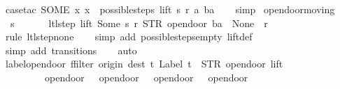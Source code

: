 \begin{isabellebody}
\ {\isacharparenleft}case{\isacharunderscore}tac\ {\isachardoublequoteopen}SOME\ x{\isachardot}\ x\ {\isacharbar}{\isasymin}{\isacharbar}\ possible{\isacharunderscore}steps\ lift\ s\ r\ a\ ba{\isachardoublequoteclose}{\isacharparenright}\isanewline
\ \ \isamarkupfalse%
\ simp%
\endisatagproof
{\isafoldproof}%
%
\isadelimproof
\isanewline
%
\endisadelimproof
\isanewline
{}\isamarkupfalse%
\ opendoor{\isacharunderscore}moving{\isacharcolon}\isanewline
\ \ {\isachardoublequoteopen}s\ {\isasymin}\ {\isacharbraceleft}{}{\isacharcomma}\ {}{\isacharcomma}\ {}{\isacharcomma}\ {}{\isacharbraceright}\ {\isasymLongrightarrow}\ ltl{\isacharunderscore}step\ lift\ {\isacharparenleft}Some\ s{\isacharparenright}\ r\ {\isacharparenleft}STR\ {\isacharprime}{\isacharprime}opendoor{\isacharprime}{\isacharprime}{\isacharcomma}\ ba{\isacharparenright}\ {\isacharequal}\ {\isacharparenleft}None{\isacharcomma}\ {\isacharbrackleft}{\isacharbrackright}{\isacharcomma}\ r{\isacharparenright}{\isachardoublequoteclose}\isanewline
%
\isadelimproof
\ \ %
\endisadelimproof
%
\isatagproof
{}\isamarkupfalse%
\ {\isacharparenleft}rule\ ltl{\isacharunderscore}step{\isacharunderscore}none{\isacharparenright}\isanewline
\ \ \isamarkupfalse%
\ {\isacharparenleft}simp\ add{\isacharcolon}\ possible{\isacharunderscore}steps{\isacharunderscore}empty\ lift{\isacharunderscore}def{\isacharparenright}\isanewline
\ \ \isamarkupfalse%
\ {\isacharparenleft}simp\ add{\isacharcolon}\ transitions{\isacharparenright}\isanewline
\ \ \isamarkupfalse%
\ auto%
\endisatagproof
{\isafoldproof}%
%
\isadelimproof
\isanewline
%
\endisadelimproof
\isanewline
{}\isamarkupfalse%
\ label{\isacharunderscore}opendoor{\isacharcolon}\ {\isachardoublequoteopen}ffilter\ {\isacharparenleft}{\isasymlambda}{\isacharparenleft}{\isacharparenleft}origin{\isacharcomma}\ dest{\isacharparenright}{\isacharcomma}\ t{\isacharparenright}{\isachardot}\ Label\ t\ {\isacharequal}\ STR\ {\isacharprime}{\isacharprime}opendoor{\isacharprime}{\isacharprime}{\isacharparenright}\ lift\ {\isacharequal}\isanewline
\ \ \ \ \ \ \ {\isacharbraceleft}{\isacharbar}{\isacharparenleft}{\isacharparenleft}{}{\isacharcomma}\ {}{\isacharparenright}{\isacharcomma}\ opendoor{}{\isacharparenright}{\isacharcomma}\ {\isacharparenleft}{\isacharparenleft}{}{\isacharcomma}\ {}{\isacharparenright}{\isacharcomma}\ opendoor{}{\isacharparenright}{\isacharcomma}\ {\isacharparenleft}{\isacharparenleft}{}{\isacharcomma}\ {}{\isacharparenright}{\isacharcomma}\ opendoor{}{\isacharparenright}{\isacharcomma}\ {\isacharparenleft}{\isacharparenleft}{}{\isacharcomma}\ {}{\isacharparenright}{\isacharcomma}\ opendoor{}{\isacharparenright}{\isacharbar}{\isacharbraceright}{\isachardoublequoteclose}\isanewline

\end{isabellebody}
